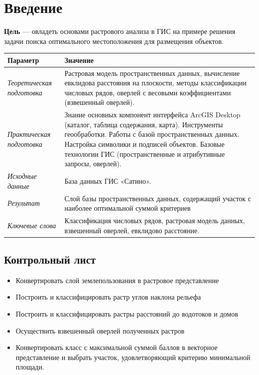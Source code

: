 \documentclass[12pt,]{book}
\providecommand{\tightlist}{%
  \setlength{\itemsep}{0pt}\setlength{\parskip}{0pt}}
\begin{document}
\hypertarget{weighted-overlay-intro}{%
\section{Введение}\label{weighted-overlay-intro}}

\textbf{Цель} --- овладеть основами растрового анализа в ГИС на примере решения задачи поиска оптимального местоположения для размещения объектов.

\begin{longtable}[]{@{}ll@{}}
\toprule
Параметр & Значение\tabularnewline
\midrule
\endhead
\emph{Теоретическая подготовка} & Растровая модель пространственных данных, вычисление евклидова расстояния на плоскости, методы классификации числовых рядов, оверлей с весовыми коэффициентами (взвешенный оверлей).\tabularnewline
\emph{Практическая подготовка} & Знание основных компонент интерфейса ArcGIS Desktop (каталог, таблица содержания, карта). Инструменты геообработки. Работы с базой пространственных данных. Настройка символики и подписей объектов. Базовые технологии ГИС (пространственные и атрибутивные запросы, оверлей).\tabularnewline
\emph{Исходные данные} & База данных ГИС «Сатино».\tabularnewline
\emph{Результат} & Слой базы пространственных данных, содержащий участок с наиболее оптимальной суммой критериев\tabularnewline
\emph{Ключевые слова} & Классификация числовых рядов, растровая модель данных, взвешенный оверлей, евклидово расстояние.\tabularnewline
\bottomrule
\end{longtable}

\hypertarget{weighted-overlay-control}{%
\subsection{Контрольный лист}\label{weighted-overlay-control}}

\begin{itemize}
\tightlist
\item
  Конвертировать слой землепользования в растровое представление
\item
  Построить и классифицировать растр углов наклона рельефа
\item
  Построить и классифицировать растры расстояний до водотоков и домов
\item
  Осуществить взвешенный оверлей полученных растров
\item
  Конвертировать класс с максимальной суммой баллов в векторное представление и выбрать участок, удовлетворяющий критерию минимальной площади.
\end{itemize}
\end{document}
